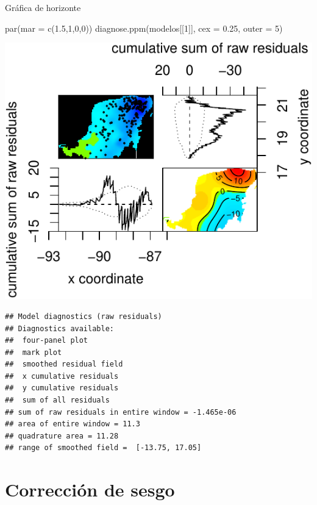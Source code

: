 \documentclass[
  11pt,
  ignorenonframetext,
]{beamer}
\newenvironment{Shaded}{}{}
\newcommand{\AttributeTok}[1]{\textcolor[rgb]{0.49,0.56,0.16}{#1}}
\newcommand{\DecValTok}[1]{\textcolor[rgb]{0.25,0.63,0.44}{#1}}
\newcommand{\FloatTok}[1]{\textcolor[rgb]{0.25,0.63,0.44}{#1}}
\newcommand{\FunctionTok}[1]{\textcolor[rgb]{0.02,0.16,0.49}{#1}}
\newcommand{\NormalTok}[1]{#1}
\begin{document}
\begin{frame}[fragile]{Gráfica de horizonte}
\protect\hypertarget{gruxe1fica-de-horizonte}{}
\begin{Shaded}
\begin{Highlighting}[]
\FunctionTok{par}\NormalTok{(}\AttributeTok{mar =} \FunctionTok{c}\NormalTok{(}\FloatTok{1.5}\NormalTok{,}\DecValTok{1}\NormalTok{,}\DecValTok{0}\NormalTok{,}\DecValTok{0}\NormalTok{))}
\FunctionTok{diagnose.ppm}\NormalTok{(modelos[[}\DecValTok{1}\NormalTok{]], }\AttributeTok{cex =} \FloatTok{0.25}\NormalTok{, }\AttributeTok{outer =} \DecValTok{5}\NormalTok{)}
\end{Highlighting}
\end{Shaded}

\begin{center}\includegraphics{Tutorial-spatstat-2_files/figure-beamer/unnamed-chunk-21-1} \end{center}

\begin{verbatim}
## Model diagnostics (raw residuals)
## Diagnostics available:
##  four-panel plot
##  mark plot 
##  smoothed residual field
##  x cumulative residuals
##  y cumulative residuals
##  sum of all residuals
## sum of raw residuals in entire window = -1.465e-06
## area of entire window = 11.3
## quadrature area = 11.28
## range of smoothed field =  [-13.75, 17.05]
\end{verbatim}
\end{frame}

\hypertarget{correcciuxf3n-de-sesgo}{%
\section{Corrección de sesgo}\label{correcciuxf3n-de-sesgo}}
\end{document}
